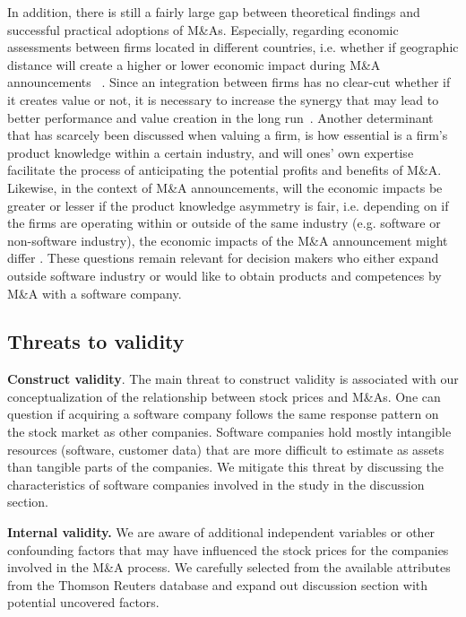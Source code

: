 \documentclass[preprint,10pt]{elsarticle}
\begin{document}
In addition, there is still a fairly large gap between theoretical findings and successful practical adoptions of M\&As. Especially, regarding economic assessments between firms located in different countries, i.e. whether if geographic distance will create a higher or lower economic impact during M\&A announcements ~\cite{McCarthy}. Since an integration between firms has no clear-cut whether if it creates value or not, it is necessary to increase the synergy that may lead to better performance and value creation in the long run~\cite{Leger}. Another determinant that has scarcely been discussed when valuing a firm, is how essential is a firm's product knowledge within a certain industry, and will ones' own expertise facilitate the process of anticipating the potential profits and benefits of M\&A. Likewise, in the context of M\&A announcements, will the economic impacts be greater or lesser if the product knowledge asymmetry is fair, i.e. depending on if the firms are operating within or outside of the same industry (e.g. software or non-software industry), the economic impacts of the M\&A announcement might differ \cite{McCarthy}. These questions remain relevant for decision makers who either expand outside software industry or would like to obtain products and competences by M\&A with a software company. 





\subsection{Threats to validity}

\textbf{Construct validity}. The main threat to construct validity is associated with our conceptualization of the relationship between stock prices and M\&As. One can question if acquiring a software company follows the same response pattern on the stock market as other companies. Software companies hold mostly intangible resources (software, customer data) that are more difficult to estimate as assets than tangible parts of the companies. We mitigate this threat by discussing the characteristics of software companies involved in the study in the discussion section.

\textbf{Internal validity.} We are aware of additional independent variables or other confounding factors that may have influenced the stock prices for the companies involved in the M\&A process. We carefully selected from the available attributes from the Thomson Reuters database and expand out discussion section with potential uncovered factors. 
\end{document}

